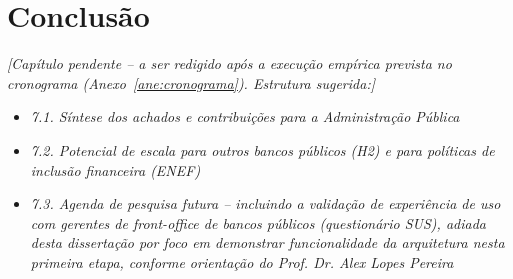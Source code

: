 \chapter{Conclus\~ao}
\label{cap:conclusao}


\textit{[Cap\'itulo pendente -- a ser redigido ap\'os a execu\c{c}\~ao
emp\'irica prevista no cronograma (Anexo~\ref{ane:cronograma}). Estrutura
sugerida:]}

\begin{itemize}
  \item[] \textit{7.1. S\'intese dos achados e contribui\c{c}\~oes para a Administra\c{c}\~ao P\'ublica}
  \item[] \textit{7.2. Potencial de escala para outros bancos p\'ublicos (H2) e para pol\'iticas de inclus\~ao financeira (ENEF)}
  \item[] \textit{7.3. Agenda de pesquisa futura -- incluindo a
  valida\c{c}\~ao de experi\^encia de uso com gerentes de front-office de
  bancos p\'ublicos (question\'ario SUS), adiada desta disserta\c{c}\~ao por foco em
  demonstrar funcionalidade da arquitetura nesta primeira etapa,
  conforme orienta\c{c}\~ao do Prof. Dr. Alex Lopes Pereira}
\end{itemize}
